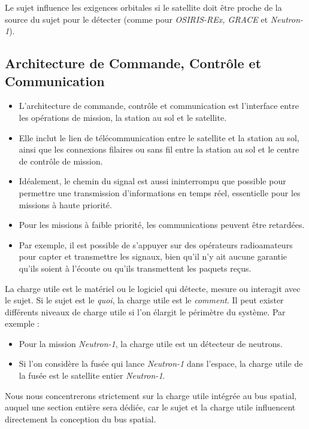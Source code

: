Le sujet influence les exigences orbitales si le satellite doit être proche de la source du sujet pour le détecter (comme pour \textit{OSIRIS-REx, GRACE} et \textit{Neutron-1}).
\subsection{Architecture de Commande, Contrôle et Communication}
\begin{itemize}
    \item L’architecture de commande, contrôle et communication est l’interface entre les opérations de mission, la station au sol et le satellite.
    \item Elle inclut le lien de télécommunication entre le satellite et la station au sol, ainsi que les connexions filaires ou sans fil entre la station au sol et le centre de contrôle de mission.
    \item Idéalement, le chemin du signal est aussi ininterrompu que possible pour permettre une transmission d’informations en temps réel, essentielle pour les missions à haute priorité.
    \item Pour les missions à faible priorité, les communications peuvent être retardées.
    \item Par exemple, il est possible de s’appuyer sur des opérateurs radioamateurs pour capter et transmettre les signaux, bien qu’il n’y ait aucune garantie qu’ils soient à l’écoute ou qu’ils transmettent les paquets reçus.
\end{itemize}

La charge utile est le matériel ou le logiciel qui détecte, mesure ou interagit avec le sujet. Si le sujet est le \textit{quoi}, la charge utile est le \textit{comment}. Il peut exister différents niveaux de charge utile si l'on élargit le périmètre du système. Par exemple :
\begin{itemize}
    \item Pour la mission \textit{Neutron-1}, la charge utile est un détecteur de neutrons.
    \item Si l'on considère la fusée qui lance \textit{Neutron-1} dans l'espace, la charge utile de la fusée est le satellite entier \textit{Neutron-1}.
\end{itemize}

Nous nous concentrerons strictement sur la charge utile intégrée au bus spatial, auquel une section entière sera dédiée, car le sujet et la charge utile influencent directement la conception du bus spatial.

